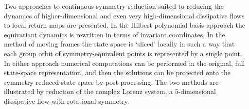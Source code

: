 Two approaches to continuous symmetry reduction suited to
reducing the dynamics of higher-dimensional and even very
high-dimensional dissipative flows to local return maps are
presented. In the Hilbert polynomial basis approach the
equivariant dynamics is rewritten in terms of invariant
coordinates. In the method of moving frames the state space
is `sliced' locally in such a way that each group orbit of
symmetry-equivalent points is represented by a single point.
In either approach numerical computations can be performed in
the original, full state-space representation, and then the
solutions can be projected onto the symmetry reduced state
space by post-processing. The two methods are illustrated by
reduction of the complex Lorenz system, a 5-dimensional
dissipative flow with rotational symmetry.

